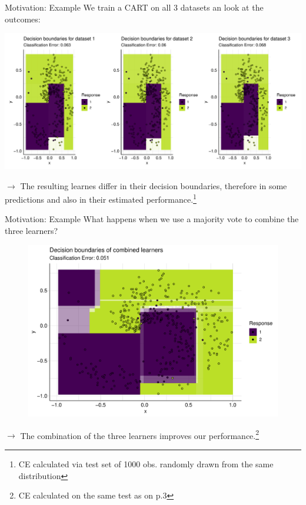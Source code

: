 \documentclass[11pt,compress,t,notes=noshow, xcolor=table]{beamer}
\begin{document}
\begin{vbframe}{Motivation: Example}
We train a CART on all 3 datasets an look at the outcomes:
\begin{center}
\includegraphics[height=0.60\textheight, keepaspectratio]{figure/cart_forest_overview_1.pdf}
\end{center}
$\rightarrow$ The resulting learnes differ in their decision boundaries, therefore in some predictions and also in their estimated performance.\footnote[frame]{CE calculated via test set of 1000 obs. randomly drawn from the same distribution}
\end{vbframe}


\begin{vbframe}{Motivation: Example }
What happens when we use a majority vote to combine the three learners?
\begin{figure}
\includegraphics[height=0.60\textheight, keepaspectratio]{figure/cart_forest_overview_2.pdf}
\end{figure}
$\rightarrow$ The combination of the three learners improves our performance.\footnote[frame]{CE calculated on the same test as on p.3}
\end{vbframe}
\end{document}
